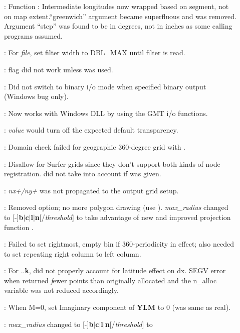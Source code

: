 \begin{description}
\item []: Function : Intermediate longitudes now wrapped based on segment,
not on map extent.``greenwich'' argument became superfluous and was
removed. Argument ``step'' was found to be in degrees, not in inches as some calling programs assumed.
\item []: For \emph{file}, set filter width to DBL\_MAX until filter is read.
\item []:  flag did not work unless  was used.
\item []: Did not switch to binary i/o mode when
 specified binary output (Windows bug only).
\item []: Now works with Windows DLL by using the GMT i/o functions.
\item []: \emph{value} would turn off the expected default transparency.
\item []: Domain check failed for geographic 360-degree grid with .
\item []: Disallow  for Surfer grids since they don't support both
kinds of node registration.  did not take into account if  was given.
\item []: \emph{nx+/ny+} was not propagated to the output grid setup.
\item []: Removed  option; no more polygon drawing (use ).
\emph{max\_radius} changed to [-]\textbf{b$|$c$|$l$|$n}[/\emph{threshold}] to
take advantage of new and improved projection function .
\item []: Failed to set rightmost, empty bin if 360-periodicity in effect;
also needed to set repeating right column to left column.
\item []: For ..\textbf{k}, did not properly account for latitude effect on dx.
SEGV error when  returned {\emph fewer} points
than originally allocated and the n\_alloc variable was not reduced accordingly.
\item []: When M=0, set Imaginary component of \textbf{YLM} to 0 (was same as real).
\item []: \emph{max\_radius} changed to [-]\textbf{b$|$c$|$l$|$n}[/\emph{threshold}] to

\end{description}
